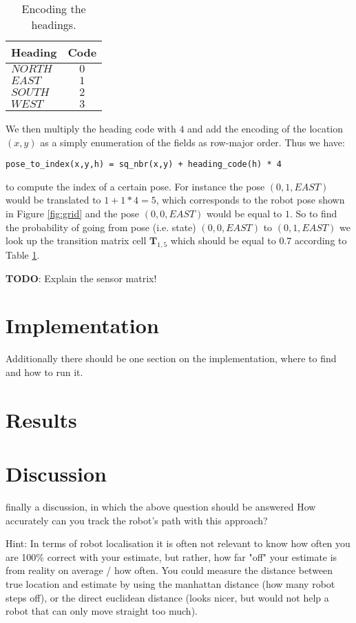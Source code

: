 \documentclass{article}
\begin{document}
\begin{table}[ht]
\centering
  \begin{tabular}{ | l | c | }
    \hline
    \textbf{Heading}    & \textbf{Code}   \\ \hline
    $NORTH$             & $0$             \\ \hline
    $EAST$              & $1$             \\ \hline
    $SOUTH$             & $2$             \\ \hline
    $WEST$              & $3$             \\ \hline
  \end{tabular}
  \caption{Encoding the headings.}
  \label{tab:headings}
\end{table}
We then multiply the heading code with $4$ and add the encoding of the location $(x,y)$ as a simply enumeration of the fields as row-major order. Thus we have:
\begin{lstlisting}
pose_to_index(x,y,h) = sq_nbr(x,y) + heading_code(h) * 4
\end{lstlisting} to compute the index of a certain pose. For instance the pose $(0,1,EAST)$ would be translated to $1 + 1*4 = 5$, which corresponds to the robot pose shown in Figure \ref{fig:grid} and the pose $(0,0,EAST)$ would be equal to $1$. So to find the probability of going from pose (i.e. state) $(0,0,EAST)$ to $(0,1,EAST)$ we look up the transition matrix cell $\textbf{T}_{1, 5}$ which should be equal to $0.7$ according to Table \ref{tab:headings}.

\textbf{TODO}: Explain the sensor matrix!

\section{Implementation}
 Additionally there should be one section on the implementation, where to find and how to run it.
 
\section{Results}


\section{Discussion}
finally a discussion, in which the above question should be answered
How accurately can you track the robot’s path with this approach?

Hint: In terms of robot localisation it is often not relevant to know how often you are 100\% correct with your estimate, but rather, how far "off" your estimate is from reality on average / how often. You could measure the distance between true location and estimate by using the manhattan distance (how many robot steps off), or the direct euclidean distance (looks nicer, but would not help a robot that can only move straight too much). 





\end{document}

